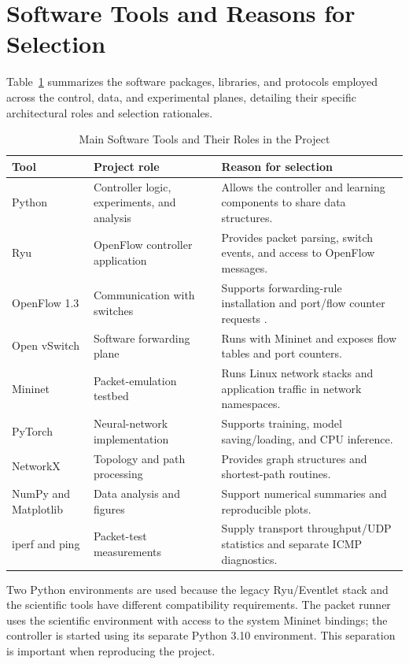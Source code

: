 \documentclass[12pt,a4paper,oneside]{report}
\let\cite\citep
\begin{document}
\section{Software Tools and Reasons for Selection}
Table~\ref{tab:tools} summarizes the software packages, libraries, and protocols employed across the control, data, and experimental planes, detailing their specific architectural roles and selection rationales.

\begin{table}[htbp]
\centering
\caption{Main Software Tools and Their Roles in the Project}
\label{tab:tools}
\small
\begin{tabularx}{\textwidth}{p{2.8cm} >{\raggedright\arraybackslash}X >{\raggedright\arraybackslash}X}
\toprule
Tool & Project role & Reason for selection \\
\midrule
Python & Controller logic, experiments, and analysis & Allows the controller and learning components to share data structures. \\
Ryu & OpenFlow controller application & Provides packet parsing, switch events, and access to OpenFlow messages. \\
OpenFlow 1.3 & Communication with switches & Supports forwarding-rule installation and port/flow counter requests \cite{mckeown2008openflow,onf2012openflow}. \\
Open vSwitch & Software forwarding plane & Runs with Mininet and exposes flow tables and port counters. \\
Mininet & Packet-emulation testbed & Runs Linux network stacks and application traffic in network namespaces. \\
PyTorch & Neural-network implementation & Supports training, model saving/loading, and CPU inference. \\
NetworkX & Topology and path processing & Provides graph structures and shortest-path routines. \\
NumPy and Matplotlib & Data analysis and figures & Support numerical summaries and reproducible plots. \\
iperf and ping & Packet-test measurements & Supply transport throughput/UDP statistics and separate ICMP diagnostics. \\
\bottomrule
\end{tabularx}
\end{table}

Two Python environments are used because the legacy Ryu/Eventlet stack and the scientific tools have different compatibility requirements. The packet runner uses the scientific environment with access to the system Mininet bindings; the controller is started using its separate Python 3.10 environment. This separation is important when reproducing the project.
\end{document}
